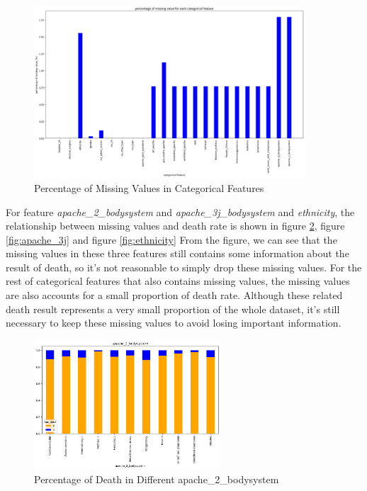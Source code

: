 \documentclass[a4paper, oneside, final, 12pt]{scrartcl} %
\begin{document}
\begin{figure}[ht]
  \centering
  \includegraphics[width=0.9\textwidth]{"./image/dataset/cat_nan_percentage.png"}
  \caption{Percentage of Missing Values in Categorical Features}
  \label{fig:missing_cat}
\end{figure}

For feature \emph{apache\_2\_bodysystem} and \emph{apache\_3j\_bodysystem} and \emph{ethnicity},
the relationship between missing values and death rate is shown in 
figure \ref{fig:apache_2}, figure \ref{fig:apache_3j} and figure \ref{fig:ethnicity}
From the figure, we can see that the missing values 
in these three features still contains some information about the result of death,
so it's not reasonable to simply drop these missing values.
For the rest of categorical features that also contains missing values,
the missing values are also accounts for a small proportion of death rate.
Although these related death result represents a very small proportion of the whole dataset,
it's still necessary to keep these missing values to avoid losing important information.

\newpage


\begin{figure}[ht]
  \centering
  \includegraphics[width=0.62\textwidth]{"./image/dataset/apache_2_dis.png"}
  \caption{Percentage of Death in Different apache\_2\_bodysystem}
  \label{fig:apache_2}
\end{figure}
\end{document}
